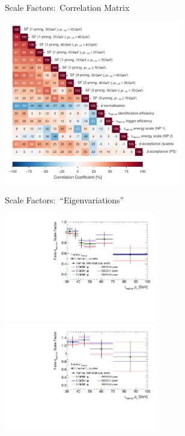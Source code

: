 \documentclass[11pt, xcolor={dvipsnames}, aspectratio=169]{beamer}
\begin{document}

\begin{frame}{Scale Factors:\ Correlation Matrix}
  \centering

  \includegraphics[width=0.58\textwidth]{ttbarSF/correlation_matrix}
\end{frame}


\begin{frame}{Scale Factors:\ ``Eigenvariations''}
  \centering

  \includegraphics[width=0.5\textwidth]{ttbarSF/ttbarSF_eigvar_1p}%
  \includegraphics[width=0.5\textwidth]{ttbarSF/ttbarSF_eigvar_3p}
\end{frame}

\end{document}

